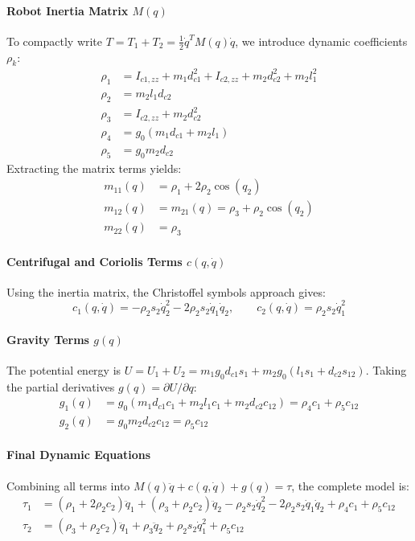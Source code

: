 \documentclass[11pt,a4paper]{article}
\begin{document}
\paragraph{Robot Inertia Matrix $M(q)$}
To compactly write $T = T_1 + T_2 = \frac{1}{2} \dot{q}^T M(q) \dot{q}$, we introduce dynamic coefficients $\rho_k$:
\begin{align*}
    \rho_1 &= I_{c1,zz} + m_1 d_{c1}^2 + I_{c2,zz} + m_2 d_{c2}^2 + m_2 l_1^2 \\
    \rho_2 &= m_2 l_1 d_{c2} \\
    \rho_3 &= I_{c2,zz} + m_2 d_{c2}^2 \\
    \rho_4 &= g_0(m_1 d_{c1} + m_2 l_1) \\
    \rho_5 &= g_0 m_2 d_{c2}
\end{align*}
Extracting the matrix terms yields:
\begin{align}
    m_{11}(q) &= \rho_1 + 2\rho_2 \cos(q_2) \\
    m_{12}(q) &= m_{21}(q) = \rho_3 + \rho_2 \cos(q_2) \\
    m_{22}(q) &= \rho_3
\end{align}

\paragraph{Centrifugal and Coriolis Terms $c(q, \dot{q})$}
Using the inertia matrix, the Christoffel symbols approach gives:
\begin{equation}
    c_1(q, \dot{q}) = -\rho_2 s_2 \dot{q}_2^2 - 2\rho_2 s_2 \dot{q}_1 \dot{q}_2, \quad \quad c_2(q, \dot{q}) = \rho_2 s_2 \dot{q}_1^2
\end{equation}

\paragraph{Gravity Terms $g(q)$}
The potential energy is $U = U_1 + U_2 = m_1 g_0 d_{c1} s_1 + m_2 g_0 (l_1 s_1 + d_{c2} s_{12})$. 
Taking the partial derivatives $g(q) = \partial U / \partial q$:
\begin{align}
    g_1(q) &= g_0(m_1 d_{c1} c_1 + m_2 l_1 c_1 + m_2 d_{c2} c_{12}) = \rho_4 c_1 + \rho_5 c_{12} \\
    g_2(q) &= g_0 m_2 d_{c2} c_{12} = \rho_5 c_{12}
\end{align}

\paragraph{Final Dynamic Equations}
Combining all terms into $M(q)\ddot{q} + c(q, \dot{q}) + g(q) = \tau$, the complete model is:
\begin{align}
    \tau_1 &= (\rho_1 + 2\rho_2 c_2)\ddot{q}_1 + (\rho_3 + \rho_2 c_2)\ddot{q}_2 - \rho_2 s_2 \dot{q}_2^2 - 2\rho_2 s_2 \dot{q}_1 \dot{q}_2 + \rho_4 c_1 + \rho_5 c_{12} \\
    \tau_2 &= (\rho_3 + \rho_2 c_2)\ddot{q}_1 + \rho_3 \ddot{q}_2 + \rho_2 s_2 \dot{q}_1^2 + \rho_5 c_{12}
\end{align}
\end{document}
